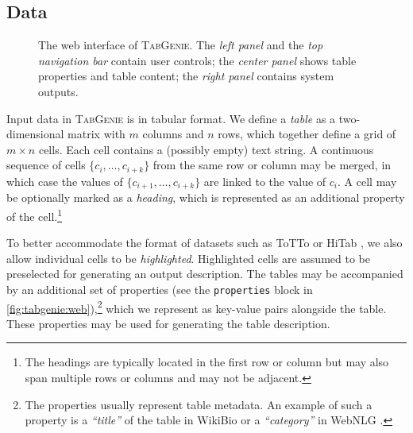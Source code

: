 \subsection{Data}
\label{sec:tabgenie:data}

\begin{figure}[t]
    \centering
    \setlength{\fboxsep}{0pt}
    \caption[The web interface of \textsc{TabGenie}.]{The web interface of \textsc{TabGenie}. The \emph{left panel} and the \emph{top navigation bar} contain user controls; the \emph{center panel} shows table properties and table content; the \emph{right panel} contains system outputs.}
    \label{fig:tabgenie:web}
\end{figure}
Input data in \textsc{TabGenie} is in tabular format. We define a \textit{table} as a two-dimensional matrix with $m$ columns and $n$ rows, which together define a grid of $m \times n$ cells. Each cell contains a (possibly empty) text string. A continuous sequence of cells $\{c_{i}, \ldots, c_{i+k}\}$ from the same row or column may be merged, in which case the values of $\{c_{i+1},\ldots,c_{i+k}\}$ are linked to the value of $c_{i}$.  A cell may be optionally marked as a \textit{heading}, which is represented as an additional property of the cell.\footnote{The headings are typically located in the first row or column but may also span multiple rows or columns and may not be adjacent.}

To better accommodate the format of datasets such as ToTTo \cite{parikhToTToControlledTableToText2020} or HiTab \cite{chengHiTabHierarchicalTable2021}, we also allow individual cells to be \textit{highlighted}. Highlighted cells are assumed to be preselected for generating an output description. The tables may be accompanied by an additional set of properties (see the \texttt{properties} block in \autoref{fig:tabgenie:web}),\footnote{The properties usually represent table metadata. An example of such a property is a \textit{``title''} of the table in WikiBio \cite{lebretNeuralTextGeneration2016} or a \textit{``category''} in WebNLG \cite{gardentWebNLGChallengeGenerating2017}.} which we represent as key-value pairs alongside the table. These properties may be used for generating the table description.

